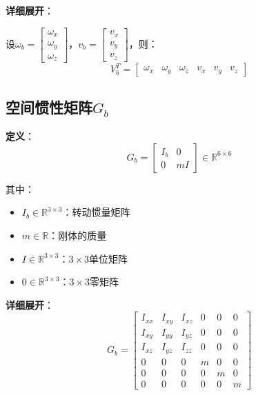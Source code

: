 \documentclass[12pt,a4paper]{article}
\begin{document}
\textbf{详细展开}：

设$\omega_b = \begin{bmatrix} \omega_x \\ \omega_y \\ \omega_z \end{bmatrix}$，$v_b = \begin{bmatrix} v_x \\ v_y \\ v_z \end{bmatrix}$，则：
\begin{equation}
V_b^T = \begin{bmatrix} \omega_x & \omega_y & \omega_z & v_x & v_y & v_z \end{bmatrix}
\end{equation}

\subsection{空间惯性矩阵$G_b$}

\textbf{定义}：
\begin{equation}
G_b = \begin{bmatrix} I_b & 0 \\ 0 & mI \end{bmatrix} \in \mathbb{R}^{6 \times 6}
\label{eq:Gb_definition}
\end{equation}

其中：
\begin{itemize}
\item $I_b \in \mathbb{R}^{3 \times 3}$：转动惯量矩阵
\item $m \in \mathbb{R}$：刚体的质量
\item $I \in \mathbb{R}^{3 \times 3}$：$3 \times 3$单位矩阵
\item $0 \in \mathbb{R}^{3 \times 3}$：$3 \times 3$零矩阵
\end{itemize}

\textbf{详细展开}：
\begin{equation}
G_b = \begin{bmatrix}
I_{xx} & I_{xy} & I_{xz} & 0 & 0 & 0 \\
I_{xy} & I_{yy} & I_{yz} & 0 & 0 & 0 \\
I_{xz} & I_{yz} & I_{zz} & 0 & 0 & 0 \\
0 & 0 & 0 & m & 0 & 0 \\
0 & 0 & 0 & 0 & m & 0 \\
0 & 0 & 0 & 0 & 0 & m
\end{bmatrix}
\end{equation}
\end{document}
